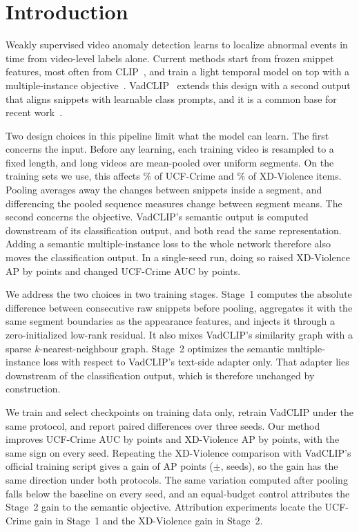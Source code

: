 
\section{Introduction}
\label{sec:intro}

Weakly supervised video anomaly detection learns to localize abnormal events in time from video-level labels alone. Current methods start from frozen snippet features, most often from CLIP~\cite{radford2021clip}, and train a light temporal model on top with a multiple-instance objective~\cite{sultani2018real}. VadCLIP~\cite{wu2024vadclip} extends this design with a second output that aligns snippets with learnable class prompts, and it is a common base for recent work~\cite{yang2024tpwng,wu2024stprompt}.

Two design choices in this pipeline limit what the model can learn. The first concerns the input. Before any learning, each training video is resampled to a fixed length, and long videos are mean-pooled over uniform segments. On the training sets we use, this affects \ucfTrainAvgFrac\% of UCF-Crime and \xdTrainAvgFrac\% of XD-Violence items. Pooling averages away the changes between snippets inside a segment, and differencing the pooled sequence measures change between segment means. The second concerns the objective. VadCLIP's semantic output is computed downstream of its classification output, and both read the same representation. Adding a semantic multiple-instance loss to the whole network therefore also moves the classification output. In a single-seed run, doing so raised XD-Violence AP by \fullGXdApTwo{} points and changed UCF-Crime AUC by \fullGUcfAucOne{} points.

We address the two choices in two training stages. Stage~1 computes the absolute difference between consecutive raw snippets before pooling, aggregates it with the same segment boundaries as the appearance features, and injects it through a zero-initialized low-rank residual. It also mixes VadCLIP's similarity graph with a sparse $k$-nearest-neighbour graph. Stage~2 optimizes the semantic multiple-instance loss with respect to VadCLIP's text-side adapter only. That adapter lies downstream of the classification output, which is therefore unchanged by construction.

We train and select checkpoints on training data only, retrain VadCLIP under the same protocol, and report paired differences over three seeds. Our method improves UCF-Crime AUC by \ucfGainMean{} points and XD-Violence AP by \xdGainMean{} points, with the same sign on every seed. Repeating the XD-Violence comparison with VadCLIP's official training script gives a gain of \offGainMean{} AP points ($\pm$\offGainSd, \offGainPos{} seeds), so the gain has the same direction under both protocols. The same variation computed after pooling falls below the baseline on every seed, and an equal-budget control attributes the Stage~2 gain to the semantic objective. Attribution experiments locate the UCF-Crime gain in Stage~1 and the XD-Violence gain in Stage~2.

